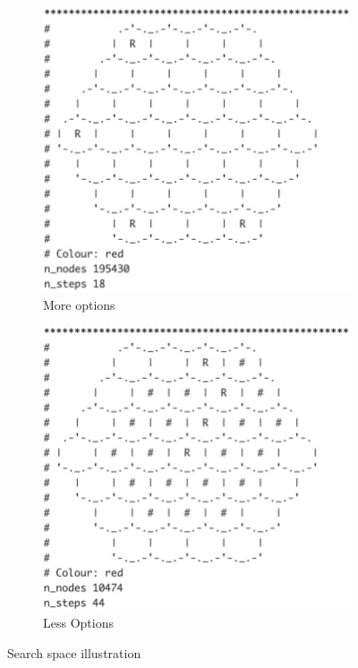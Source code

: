 \documentclass[10.5pt,a4paper]{article}
\begin{document}
        \begin{figure}
            \begin{center}
                \begin{subfigure}[b]{0.25\textwidth}
                    \includegraphics[width=\textwidth]{SpaceComplexity1.png}
                    \caption{More options}
                    \label{fig:more_move}
                \end{subfigure}
                \begin{subfigure}[b]{0.25\textwidth}
                    \includegraphics[width=\textwidth]{SpaceComplexity2.png}
                    \caption{Less Options}
                    \label{fig:less_move}
                \end{subfigure}
            \end{center}
            \vspace{-10pt}
            \caption{Search space illustration}\label{fig:moves}
        \end{figure}
\end{document}
